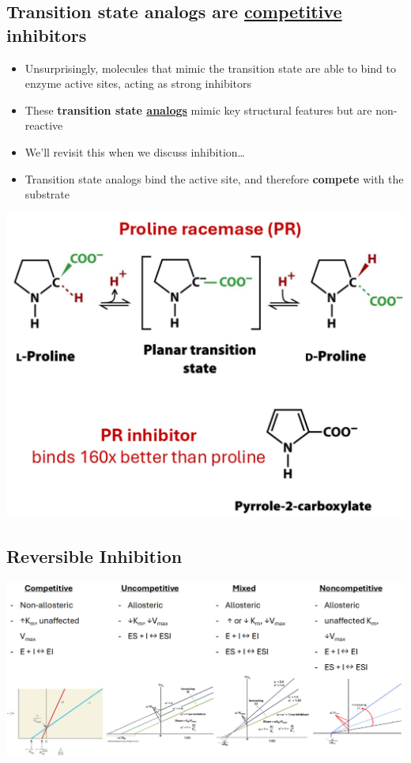 \documentclass[10pt]{article}
\begin{document}
\pagebreak
\subsection*{Transition state analogs are \underline{competitive} inhibitors}
\begin{itemize}
    \item Unsurprisingly, molecules that mimic the transition state are able to bind to enzyme active sites, acting as strong inhibitors
    \item These \textbf{transition state \underline{analogs}} mimic key structural features but are non-reactive
    \item We'll revisit this when we discuss inhibition\dots
    \item Transition state analogs bind the active site, and therefore \textbf{compete} with the substrate
\end{itemize}
\begin{center}
    \includegraphics*[scale=0.5]{L1_13.png}
\end{center}

\subsection*{Reversible Inhibition}
\begin{center}
    \includegraphics*[width=\textwidth]{L1_14.png}
\end{center}
\end{document}
